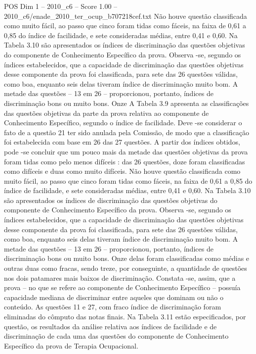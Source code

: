\begin{textsample}{POS Dim 1 – 2010\_c6 – Score 1.00 – 2010\_c6/enade\_2010\_ter\_ocup\_b707218cef.txt}
Não houve questão classificada como muito fácil, ao passo que cinco foram tidas como fáceis, na faixa de 0,61 a 0,85 do índice de facilidade, e sete consideradas médias, entre 0,41 e 0,60.
Na Tabela 3.10 são apresentados os índices de discriminação das questões objetivas do componente de Conhecimento Específico da prova.
Observa -se, segundo os índices estabelecidos, que a capacidade de discriminação das questões objetivas desse componente da prova foi classificada, para sete das 26 questões válidas, como boa, enquanto seis delas tiveram índice de discriminação muito bom.
A metade das questões – 13 em 26 – proporcionou, portanto, índices de discriminação bons ou muito bons.
Onze A Tabela 3.9 apresenta as classificações das questões objetivas da parte da prova relativa ao componente de Conhecimento Específico, segundo o índice de facilidade.
Deve -se considerar o fato de a questão 21 ter sido anulada pela Comissão, de modo que a classificação foi estabelecida com base em 26 das 27 questões.
A partir dos índices obtidos, pode -se concluir que um pouco mais da metade das questões objetivas da prova foram tidas como pelo menos difíceis : das 26 questões, doze foram classificadas como difíceis e duas como muito difíceis.
Não houve questão classificada como muito fácil, ao passo que cinco foram tidas como fáceis, na faixa de 0,61 a 0,85 do índice de facilidade, e sete consideradas médias, entre 0,41 e 0,60.
Na Tabela 3.10 são apresentados os índices de discriminação das questões objetivas do componente de Conhecimento Específico da prova.
Observa -se, segundo os índices estabelecidos, que a capacidade de discriminação das questões objetivas desse componente da prova foi classificada, para sete das 26 questões válidas, como boa, enquanto seis delas tiveram índice de discriminação muito bom.
A metade das questões – 13 em 26 – proporcionou, portanto, índices de discriminação bons ou muito bons.
Onze delas foram classificadas como médias e outras duas como fracas, sendo treze, por conseguinte, a quantidade de questões nos dois patamares mais baixos de discriminação.
Constata -se, assim, que a prova – no que se refere ao componente de Conhecimento Específico – possuía capacidade mediana de discriminar entre aqueles que dominam ou não o conteúdo.
As questões 11 e 27, com fraco índice de discriminação foram eliminadas do cômputo das notas finais.
Na Tabela 3.11 estão especificados, por questão, os resultados da análise relativa aos índices de facilidade e de discriminação de cada uma das questões do componente de Conhecimento Específico da prova de Terapia Ocupacional.

\end{textsample}
